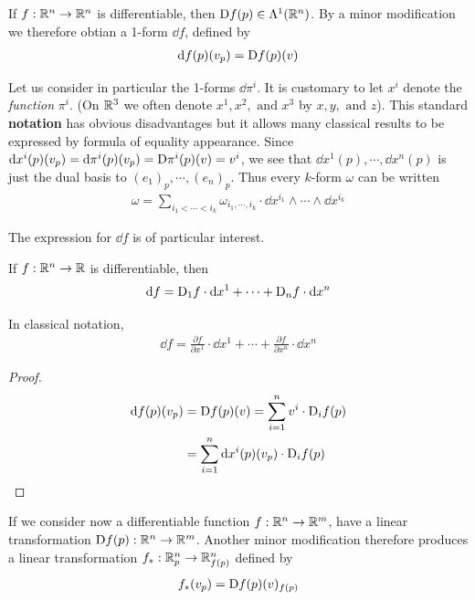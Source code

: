 If $f:\mathbb{R}^n\to \mathbb{R}^n$ is differentiable, then $\mathrm{D}f(p)\in\Lambda^1(\mathbb{R}^n)$. 
By a minor modification we therefore obtian a 1-form $\dd f$, defined by 
\begin{align*}
    \mathrm{d} f(p)(v_p) = \mathrm{D}f(p)(v)
\end{align*}

Let us consider in particular the 1-forms $\dd \pi^i$. It is customary to let $x^i$ denote the 
\textit{function} $\pi^i$. (On $\mathbb{R}^3$ we often denote $x^1,x^2,\text{ and }x^3$ by $x, y,\text{ and } z$).
This standard \textbf{notation} has obvious disadvantages but it allows many classical results to be expressed by 
formula of equality appearance. Since $\mathrm{d} x^i(p)(v_p) =\mathrm{d} \pi^i(p)(v_p) = \mathrm{D}\pi^i(p)(v) = v^i$, we 
see that $\dd x^1(p),\cdots,\dd x^n(p)$ is just the dual basis to $(e_1)_p,\cdots,(e_n)_p$. Thus
every $k$-form $\omega$ can be written
\begin{align*}
    \omega = \sum_{i_1<\cdots<i_k}^{}{\omega_{i_1,\cdots,i_k}\cdot \dd x^{i_1}\wedge\cdots\wedge\dd x^{i_k}}
\end{align*}

The expression for $\dd f$ is of particular interest.

\begin{theorem}
    If $f:\mathbb{R}^n\to \mathbb{R}$ is differentiable, then 
    \begin{align*}
        \mathrm{d} f = \mathrm{D}_1 f\cdot \mathrm{d} x^1 + \cdots + \mathrm{D}_nf\cdot \mathrm{d} x^n
    \end{align*} 

    In classical notation,
    \begin{align*}
        \dd f = \frac{\partial f}{\partial x^1}\cdot \dd x^1 + \cdots + \frac{\partial f}{\partial x^n}\cdot \dd x^n
    \end{align*}
\end{theorem}

\begin{proof}
    \begin{align*}
        \mathrm{d} f(p)(v_p) 
            & = \mathrm{D}f(p)(v) 
            = \sum_{i=1}^{n}{v^i\cdot \mathrm{D}_i f(p)} \\
            & = \sum_{i=1}^{n}{\mathrm{d} x^i(p)(v_p)\cdot \mathrm{D}_i f(p)}
    \end{align*}
\end{proof}


If we consider now a differentiable function $f:\mathbb{R}^n\to \mathbb{R}^m$, 
have a linear transformation $\mathrm{D}f(p):\mathbb{R}^n\to \mathbb{R}^m$. Another 
minor modification therefore produces a linear transformation $f_*:\mathbb{R}^n_p\to \mathbb{R}^n_{f(p)}$
defined by 
\begin{align*}
    f_*(v_p) = \mathrm{D}f(p)(v)_{f(p)}
\end{align*}

